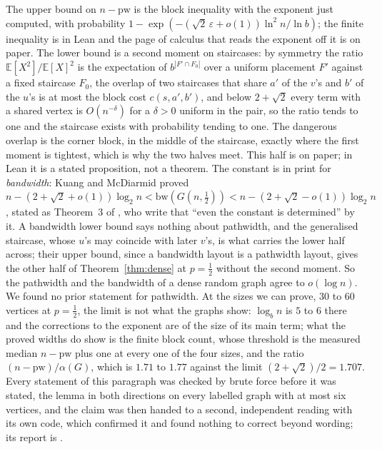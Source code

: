 The upper bound on $n-\mathrm{pw}$ is the block inequality with the exponent
just computed, with probability $1-\exp(-(\sqrt2\,\varepsilon+o(1))\ln^{2}n/\ln b)$;
the finite inequality is in Lean and the page of calculus that reads the
exponent off it is on paper. The lower bound is a second moment on
staircases: by symmetry the ratio $\mathbb E[X^{2}]/\mathbb E[X]^{2}$ is the
expectation of $b^{|F'\cap F_{0}|}$ over a uniform placement $F'$ against a
fixed staircase $F_{0}$, the overlap of two staircases that share $a'$ of
the $v$'s and $b'$ of the $u$'s is at most the block cost $c(s,a',b')$, and
below $2+\sqrt2$ every term with a shared vertex is $O(n^{-\delta})$ for a
$\delta>0$ uniform in the pair, so the ratio tends to one and the staircase
exists with probability tending to one. The dangerous overlap is the corner
block, in the middle of the staircase, exactly where the first moment is
tightest, which is why the two halves meet. This half is on paper; in Lean it
is a stated proposition, not a theorem. The constant is in print for
\emph{bandwidth}: Kuang and McDiarmid proved
$n-(2+\sqrt2+o(1))\log_{2}n<\mathrm{bw}(G(n,\tfrac12))<n-(2+\sqrt2-o(1))\log_{2}n$
\citep{KuangMcDiarmid1985}, stated as Theorem~3 of \citet{ErdosHellWinkler1989},
who write that ``even the constant is determined'' by it. A bandwidth lower
bound says nothing about pathwidth, and the generalised staircase, whose
$u$'s may coincide with later $v$'s, is what carries the lower half across;
their upper bound, since a bandwidth layout is a pathwidth layout, gives the
other half of Theorem~\ref{thm:dense} at $p=\tfrac12$ without the second
moment. So the pathwidth and the bandwidth of a dense random graph agree to
$o(\log n)$. We found no prior statement for pathwidth. At the sizes we can
prove, $30$ to $60$ vertices at $p=\tfrac12$, the limit is not what the
graphs show: $\log_{b}n$ is $5$ to $6$ there and the corrections to the
exponent are of the size of its main term; what the proved widths do show is
the finite block count, whose threshold is the measured median $n-\mathrm{pw}$
plus one at every one of the four sizes, and the ratio
$(n-\mathrm{pw})/\alpha(G)$, which is $1.71$ to $1.77$ against the limit
$(2+\sqrt2)/2=1.707$. Every statement of this paragraph was checked by brute
force before it was stated, the lemma in both directions on every labelled
graph with at most six vertices, and the claim was then handed to a second,
independent reading with its own code, which confirmed it and found nothing
to correct beyond wording; its report is .

